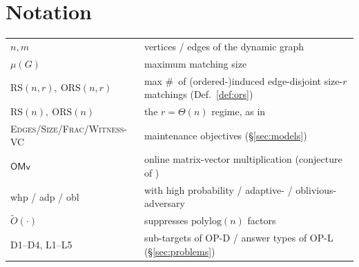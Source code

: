 \documentclass[11pt]{article}
\theoremstyle{definition}
\theoremstyle{remark}
\newcommand{\ORS}{\mathrm{ORS}}
\newcommand{\RS}{\mathrm{RS}}
\newcommand{\polylog}{\mathrm{polylog}}
\newcommand{\OMv}{\mathsf{OMv}}
\newcommand{\Otil}{\widetilde{O}}
\newcommand{\mm}{\mu}
\begin{document}
\section{Notation}
\label{app:notation}

\begin{center}
\small
\begin{tabular}{@{}ll@{}}
\toprule
$n,m$ & vertices / edges of the dynamic graph\\
$\mm(G)$ & maximum matching size\\
$\RS(n,r),\ \ORS(n,r)$ & max \#\ of (ordered-)induced edge-disjoint
size-$r$ matchings (Def.~\ref{def:ors})\\
$\RS(n),\ \ORS(n)$ & the $r=\Theta(n)$ regime, as in \cite{BG24}\\
\textsc{Edges}/\textsc{Size}/\textsc{Frac}/\textsc{Witness-VC} &
maintenance objectives (\S\ref{sec:models})\\
$\OMv$ & online matrix-vector multiplication (conjecture of
\cite{HKNS15})\\
whp / adp / obl & with high probability / adaptive- / oblivious-%
adversary\\
$\Otil(\cdot)$ & suppresses $\polylog(n)$ factors\\
D1--D4, L1--L5 & sub-targets of OP-D / answer types of OP-L
(\S\ref{sec:problems})\\
\bottomrule
\end{tabular}
\end{center}
\end{document}
